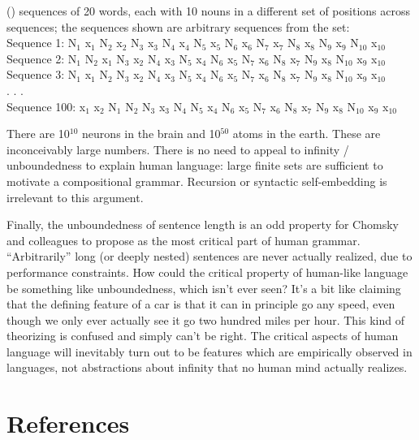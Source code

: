 \documentclass{article}
\newcounter{examplectr}
\newenvironment{myexample}
   { \vspace{20pt}
     \noindent
     \begin{minipage}{\textwidth}    %

     \refstepcounter{examplectr}     %
     (\arabic{examplectr})}%
   { \vspace{20pt}
     \end{minipage}}
\begin{document}
\begin{myexample}
\label{ex1}
 sequences of 20 words, each with 10 nouns in a different set of positions across sequences; the sequences shown are arbitrary sequences from the set:\\
Sequence 1: N$_1$ x$_1$ N$_2$ x$_2$ N$_3$ x$_3$ N$_4$ x$_4$ N$_5$ x$_5$ N$_6$ x$_6$ N$_7$ x$_7$ N$_8$ x$_8$ N$_9$ x$_9$ N$_{10}$ x$_{10}$\\
Sequence 2: N$_1$ N$_2$ x$_1$ N$_3$ x$_2$ N$_4$ x$_3$ N$_5$ x$_4$ N$_6$ x$_5$ N$_7$ x$_6$ N$_8$ x$_7$ N$_9$ x$_8$ N$_{10}$ x$_9$ x$_{10}$\\
Sequence 3: N$_1$ x$_1$ N$_2$ N$_3$ x$_2$ N$_4$ x$_3$ N$_5$ x$_4$ N$_6$ x$_5$ N$_7$ x$_6$ N$_8$ x$_7$ N$_9$ x$_8$ N$_{10}$ x$_9$ x$_{10}$\\
. . .\\
Sequence 100: x$_1$ x$_2$ N$_1$ N$_2$ N$_3$ x$_3$ N$_4$ N$_5$ x$_4$ N$_6$ x$_5$ N$_7$ x$_6$ N$_8$ x$_7$ N$_9$ x$_8$ N$_{10}$ x$_9$ x$_{10}$
\end{myexample}

There are 10$^{10}$ neurons in the brain and 10$^{50}$ atoms in the earth. These are inconceivably large numbers. There is no need to appeal to infinity / unboundedness to explain human language: large finite sets are sufficient to motivate a compositional grammar. Recursion or syntactic self-embedding is irrelevant to this argument.

Finally, the unboundedness of sentence length is an odd property for Chomsky and colleagues to propose as the most critical part of human grammar.  ``Arbitrarily'' long (or deeply nested) sentences are never actually realized, due to performance constraints. How could the critical property of human-like language be something like unboundedness, which isn’t ever seen? It's a bit like claiming that the defining feature of a car is that it can in principle go any speed, even though we only ever actually see it go two hundred miles per hour. This kind of theorizing is confused and simply can't be right. The critical aspects of human language will inevitably turn out to be features which are empirically observed in languages, not abstractions about infinity that no human mind actually realizes.

\newpage

\section{References}


\end{document}
